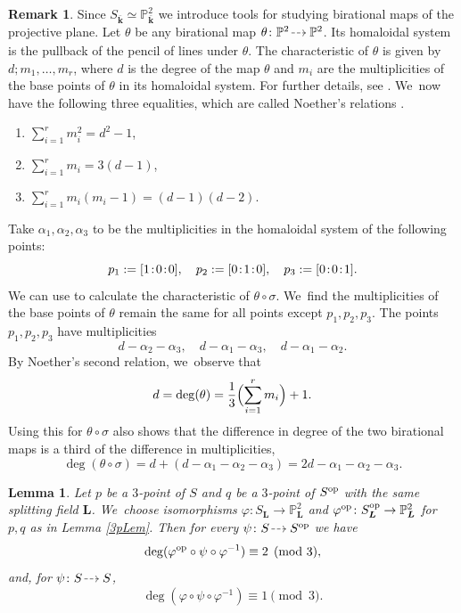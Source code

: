 \documentclass[JEP,XML,SOM,Unicode,NoFloatCountersInSection, NoEqCountersInSection,published]{cedram}
\newcommand{\dradpl}{{\hspace*{-2mm}\begin{tikzcd}[ampersand replacement=\&,column sep = scriptsize]\mbox{}\ar[r,dashed]\&\mbox{}\end{tikzcd}\hspace*{-2mm}}}
\newcommand{\dratst}{{\hspace*{-2.5mm}\begin{tikzcd}[ampersand replacement=\&,column sep = small]\mbox{}\ar[r,dashed]\&\mbox{}\end{tikzcd}\hspace*{-2mm}}}
\let\drascst\dratst
\newcommand{\dra}{\mathchoice{\dradpl}{\dratst}{\drascst}{\drascst}}
\newcommand{\op}{\textup{op}}
\newcommand{\sep}{\mkern2mu{:}\mkern2mu}
\newtheorem{lemma}[theorem]{Lemma}
\theoremstyle{definition}
\newtheorem{remark}[theorem]{Remark}
\newcommand{\kk}{{\boldsymbol{k}}}
\newcommand{\LL}{{\boldsymbol{L}}}
\begin{document}
\begin{remark} \label{rem: HomSys}
Since $S_{\bar{\kk}} \simeq \mathbb{P}^2_{\bar{\kk}}$ we introduce tools for studying birational maps of the projective plane. Let $\theta$ be any birational map $\theta \colon \mathbb{P}^2 \dra \mathbb{P}^2$. Its homaloidal system is the pullback of the pencil of lines under $\theta$. The characteristic of $\theta$ is given by $d;m_1, \dots , m_r$, where $d$ is the degree of the map $\theta$ and $m_i$ are the multiplicities of the base points of $\theta$ in its homaloidal system. For further details, see \cite[\S 2]{zbMATH01683518}. We~now have the following three equalities, which are called Noether's relations \cite[\S 2.5, p.\,51]{zbMATH01683518}.
\begin{enumerate}
\item $\sum_{i = 1}^r m_i^2 = d^2 - 1$,

\item $\sum_{i = 1}^r m_i = 3(d - 1)$,

\item $\sum_{i = 1}^r m_i (m_i - 1) = (d - 1) (d - 2)$.
\end{enumerate}
Take $\alpha_1, \alpha_2, \alpha_3$ to be the multiplicities in the homaloidal system of the following points:
\[
p_1 := [1\sep 0\sep 0],\quad p_2 := [0\sep 1\sep 0],\quad p_3 := [0\sep 0\sep 1].
\]
We can use \cite[\S 4]{zbMATH01683518} to calculate the characteristic of $\theta \circ \sigma$. We~find the multiplicities of the base points of $\theta$ remain the same for all points except $p_1,p_2,p_3$. The points $p_1,p_2,p_3$ have multiplicities
\[
d - \alpha_2 - \alpha_3,\quad d - \alpha_1 - \alpha_3,\quad d - \alpha_1 - \alpha_2.
\]
By Noether's second relation, we~observe that
\[
d = \deg(\theta) = \frac{1}{3} \Bigl(\sum_{i = 1}^r m_i\Bigr) + 1.
\]
Using this for $\theta \circ \sigma$ also shows that the difference in degree of the two birational maps is a third of the difference in multiplicities, \ie
\[
\deg (\theta \circ \sigma) = d + (d - \alpha_1 - \alpha_2 - \alpha_3) = 2d - \alpha_1 - \alpha_2 - \alpha_3.
\]
\end{remark}

\begin{lemma} \label{lem: degofbir}
Let $p$ be a $3$\nobreakdash-point of $S$ and $q$ be a $3$\nobreakdash-point of $S^{\op}$ with the same splitting field $\LL$. We~choose isomorphisms $\varphi \colon S_{\LL}\to \mathbb{P}^2_{\LL}$ and $\varphi^{\op}\colon S^{\op}_{\LL} \to \mathbb{P}^2_{\LL}$ for $p,q$ as in Lemma \ref{3pLem}.
Then for every $\psi \colon S \dra S^{\op}$ we have
\[
\deg(\varphi^{\op} \circ \psi \circ \varphi^{-1}) \equiv 2 \pmod 3,
\]
and, for $\psi \colon S \dra S$,
\[
\deg(\varphi \circ \psi \circ \varphi^{-1}) \equiv 1 \pmod 3.
\]
\end{lemma}
\end{document}
